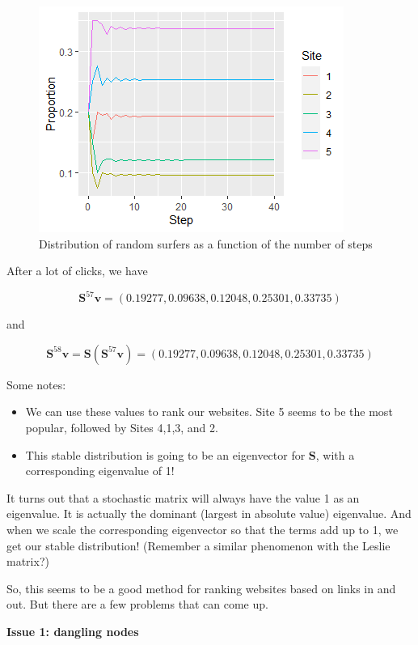 \documentclass[
]{book}
\theoremstyle{definition}
\theoremstyle{definition}
\theoremstyle{definition}
\theoremstyle{definition}
\theoremstyle{remark}
\begin{document}
\begin{figure}

{\centering \includegraphics[width=0.75\linewidth]{images/rw4} 

}

\caption{Distribution of random surfers as a function of the number of steps}\label{fig:rwalker}
\end{figure}

After a lot of clicks, we have

\[\mathbf{S}^{57}\mathbf{v}=(0.19277,0.09638,0.12048,0.25301,0.33735)\]

and

\[\mathbf{S}^{58}\mathbf{v}=\mathbf{S}(\mathbf{S}^{57}\mathbf{v})=(0.19277,0.09638,0.12048,0.25301,0.33735)\]

Some notes:

\begin{itemize}
\item
  We can use these values to rank our websites. Site 5 seems to be the most popular, followed by Sites 4,1,3, and 2.
\item
  This stable distribution is going to be an eigenvector for \(\mathbf{S}\), with a corresponding eigenvalue of 1!
\end{itemize}

It turns out that a stochastic matrix will always have the value 1 as an eigenvalue. It is actually the dominant (largest in absolute value) eigenvalue. And when we scale the corresponding eigenvector so that the terms add up to 1, we get our stable distribution! (Remember a similar phenomenon with the Leslie matrix?)

So, this seems to be a good method for ranking websites based on links in and out. But there are a few problems that can come up.

\textbf{Issue 1: dangling nodes}
\end{document}

